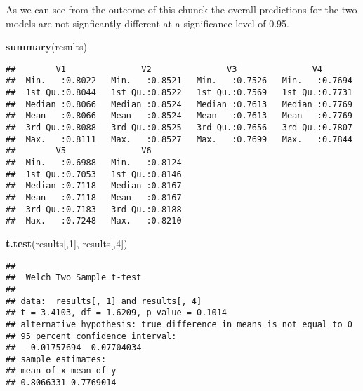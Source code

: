 \documentclass[]{article}
\newenvironment{Shaded}{\begin{snugshade}}{\end{snugshade}}
\newcommand{\DecValTok}[1]{\textcolor[rgb]{0.00,0.00,0.81}{#1}}
\newcommand{\KeywordTok}[1]{\textcolor[rgb]{0.13,0.29,0.53}{\textbf{#1}}}
\newcommand{\NormalTok}[1]{#1}
\begin{document}
As we can see from the outcome of this chunck the overall predictions
for the two models are not signficantly different at a significance
level of 0.95.

\begin{Shaded}
\begin{Highlighting}[]
\KeywordTok{summary}\NormalTok{(results)}
\end{Highlighting}
\end{Shaded}

\begin{verbatim}
##        V1               V2               V3               V4        
##  Min.   :0.8022   Min.   :0.8521   Min.   :0.7526   Min.   :0.7694  
##  1st Qu.:0.8044   1st Qu.:0.8522   1st Qu.:0.7569   1st Qu.:0.7731  
##  Median :0.8066   Median :0.8524   Median :0.7613   Median :0.7769  
##  Mean   :0.8066   Mean   :0.8524   Mean   :0.7613   Mean   :0.7769  
##  3rd Qu.:0.8088   3rd Qu.:0.8525   3rd Qu.:0.7656   3rd Qu.:0.7807  
##  Max.   :0.8111   Max.   :0.8527   Max.   :0.7699   Max.   :0.7844  
##        V5               V6        
##  Min.   :0.6988   Min.   :0.8124  
##  1st Qu.:0.7053   1st Qu.:0.8146  
##  Median :0.7118   Median :0.8167  
##  Mean   :0.7118   Mean   :0.8167  
##  3rd Qu.:0.7183   3rd Qu.:0.8188  
##  Max.   :0.7248   Max.   :0.8210
\end{verbatim}

\begin{Shaded}
\begin{Highlighting}[]
\KeywordTok{t.test}\NormalTok{(results[,}\DecValTok{1}\NormalTok{], results[,}\DecValTok{4}\NormalTok{])}
\end{Highlighting}
\end{Shaded}

\begin{verbatim}
## 
##  Welch Two Sample t-test
## 
## data:  results[, 1] and results[, 4]
## t = 3.4103, df = 1.6209, p-value = 0.1014
## alternative hypothesis: true difference in means is not equal to 0
## 95 percent confidence interval:
##  -0.01757694  0.07704034
## sample estimates:
## mean of x mean of y 
## 0.8066331 0.7769014
\end{verbatim}
\end{document}
